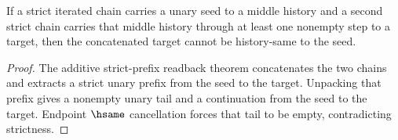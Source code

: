\begin{theorem}
\label{thm:iterated-strict-cplxdiff-add-closed-endpoint-hsame-absurd}
If a strict iterated chain carries a unary seed to a middle history and a
second strict chain carries that middle history through at least one nonempty
step to a target, then the concatenated target cannot be history-same to the
seed.
\end{theorem}
\begin{proof}
The additive strict-prefix readback theorem concatenates the two chains and
extracts a strict unary prefix from the seed to the target. Unpacking that
prefix gives a nonempty unary tail and a continuation from the seed to the
target. Endpoint \(\hsame\) cancellation forces that tail to be empty,
contradicting strictness.
\end{proof}
